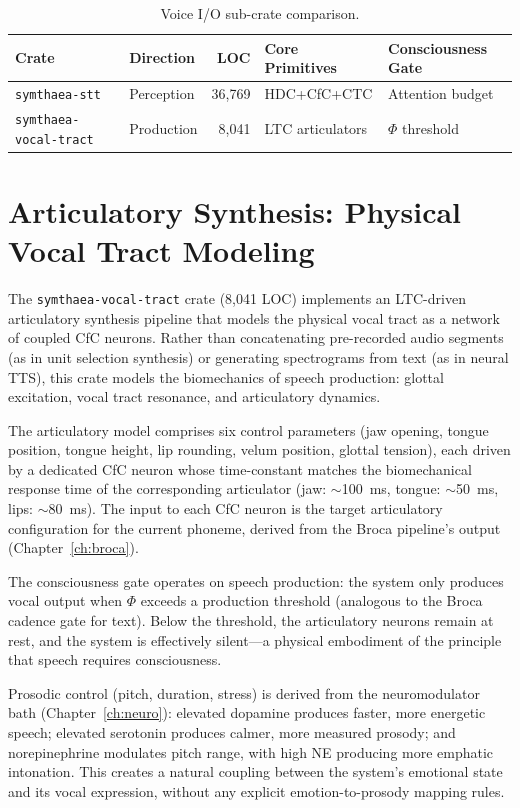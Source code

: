 \documentclass[12pt]{book}
\begin{document}
\begin{table}[htbp]
\centering
\caption{Voice I/O sub-crate comparison.}
\label{tab:voice-crates}
\begin{tabular}{llrll}
\toprule
\textbf{Crate} & \textbf{Direction} & \textbf{LOC} & \textbf{Core Primitives} & \textbf{Consciousness Gate} \\
\midrule
\texttt{symthaea-stt} & Perception & 36,769 & HDC+CfC+CTC & Attention budget \\
\texttt{symthaea-vocal-tract} & Production & 8,041 & LTC articulators & $\Phi$ threshold \\
\bottomrule
\end{tabular}
\end{table}

\section{Articulatory Synthesis: Physical Vocal Tract Modeling}

The \texttt{symthaea-vocal-tract} crate (8,041 LOC) implements an LTC-driven articulatory synthesis pipeline that models the physical vocal tract as a network of coupled CfC neurons. Rather than concatenating pre-recorded audio segments (as in unit selection synthesis) or generating spectrograms from text (as in neural TTS), this crate models the biomechanics of speech production: glottal excitation, vocal tract resonance, and articulatory dynamics.

The articulatory model comprises six control parameters (jaw opening, tongue position, tongue height, lip rounding, velum position, glottal tension), each driven by a dedicated CfC neuron whose time-constant matches the biomechanical response time of the corresponding articulator (jaw: $\sim$100~ms, tongue: $\sim$50~ms, lips: $\sim$80~ms). The input to each CfC neuron is the target articulatory configuration for the current phoneme, derived from the Broca pipeline's output (Chapter~\ref{ch:broca}).

The consciousness gate operates on speech production: the system only produces vocal output when $\Phi$ exceeds a production threshold (analogous to the Broca cadence gate for text). Below the threshold, the articulatory neurons remain at rest, and the system is effectively silent---a physical embodiment of the principle that speech requires consciousness.

Prosodic control (pitch, duration, stress) is derived from the neuromodulator bath (Chapter~\ref{ch:neuro}): elevated dopamine produces faster, more energetic speech; elevated serotonin produces calmer, more measured prosody; and norepinephrine modulates pitch range, with high NE producing more emphatic intonation. This creates a natural coupling between the system's emotional state and its vocal expression, without any explicit emotion-to-prosody mapping rules.
\end{document}
